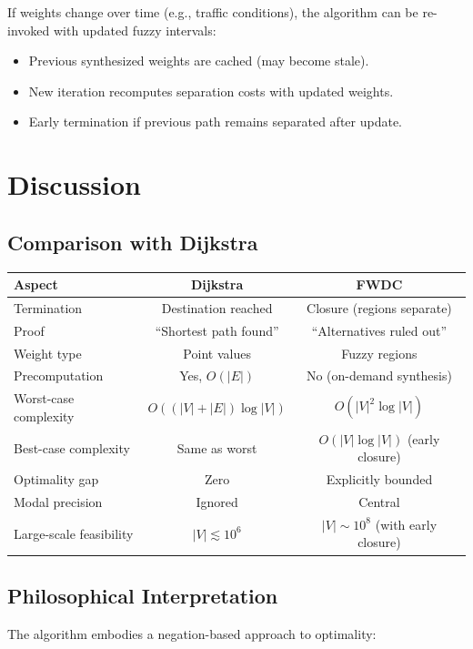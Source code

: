 \documentclass[twocolumn,11pt,a4paper]{article}
\theoremstyle{definition}
\begin{document}
If weights change over time (e.g., traffic conditions), the algorithm can be re-invoked with updated fuzzy intervals:
\begin{itemize}
\item Previous synthesized weights are cached (may become stale).
\item New iteration recomputes separation costs with updated weights.
\item Early termination if previous path remains separated after update.
\end{itemize}

\section{Discussion}

\subsection{Comparison with Dijkstra}

\begin{center}
\begin{tabular}{lcc}
\toprule
Aspect & Dijkstra & FWDC \\
\midrule
Termination & Destination reached & Closure (regions separate) \\
Proof & ``Shortest path found'' & ``Alternatives ruled out'' \\
Weight type & Point values & Fuzzy regions \\
Precomputation & Yes, $O(|E|)$ & No (on-demand synthesis) \\
Worst-case complexity & $O((|V| + |E|) \log |V|)$ & $O(|V|^2 \log |V|)$ \\
Best-case complexity & Same as worst & $O(|V| \log |V|)$ (early closure) \\
Optimality gap & Zero & Explicitly bounded \\
Modal precision & Ignored & Central \\
Large-scale feasibility & $|V| \lesssim 10^6$ & $|V| \sim 10^8$ (with early closure) \\
\bottomrule
\end{tabular}
\end{center}

\subsection{Philosophical Interpretation}

The algorithm embodies a negation-based approach to optimality:
\end{document}
